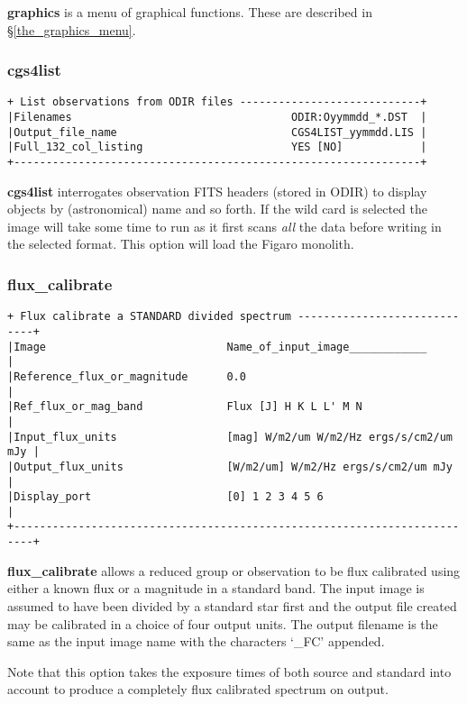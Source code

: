 {{\bf graphics} is a menu of graphical functions.
These are described in \S \ref{the_graphics_menu}.

\subsubsection{cgs4list}
\label{cgs4list}
\begin{verbatim}
+ List observations from ODIR files ----------------------------+
|Filenames                                  ODIR:Oyymmdd_*.DST  |
|Output_file_name                           CGS4LIST_yymmdd.LIS |
|Full_132_col_listing                       YES [NO]            |
+---------------------------------------------------------------+
\end{verbatim}

{\bf cgs4list} interrogates observation FITS headers (stored in ODIR) to
display objects by (astronomical) name and so forth. If the wild card 
is selected the image will take some time to run as it first scans {\em all}
the data before writing in the selected format. This option will load the
Figaro monolith.

\subsubsection{flux\_calibrate}
\label{flux_calibrate}
\begin{verbatim}
+ Flux calibrate a STANDARD divided spectrum -----------------------------+
|Image                            Name_of_input_image____________         |
|Reference_flux_or_magnitude      0.0                                     |
|Ref_flux_or_mag_band             Flux [J] H K L L' M N                   |
|Input_flux_units                 [mag] W/m2/um W/m2/Hz ergs/s/cm2/um mJy |
|Output_flux_units                [W/m2/um] W/m2/Hz ergs/s/cm2/um mJy     |
|Display_port                     [0] 1 2 3 4 5 6                         |
+-------------------------------------------------------------------------+
\end{verbatim}

{\bf flux\_calibrate} allows a reduced group or observation to be flux
calibrated using either a known flux or a magnitude in a standard 
band. The input image is assumed to have been divided by a standard 
star first and the output file created may be calibrated in a choice 
of four output units. The output filename is the same as the input
image name with the characters `\_FC' appended.

Note that this option takes the exposure times of both source and standard
into account to produce a completely flux calibrated spectrum on output.

}
